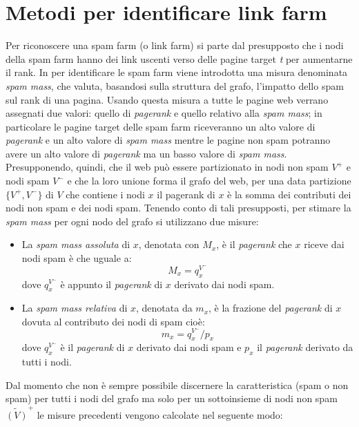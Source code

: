 \section{Metodi per identificare link farm}
Per riconoscere una spam farm (o link farm) si parte dal presupposto che i nodi della spam farm hanno dei link uscenti verso delle pagine target \textit{t} per aumentarne il rank. In \cite{Gyongyi:2006:LSD:1182635.1164166} per identificare le spam farm viene introdotta una misura denominata \textit{spam mass}, che valuta, basandosi sulla struttura del grafo, l'impatto dello spam sul rank di una pagina. Usando questa misura a tutte le pagine web verrano assegnati due valori: quello di \textit{pagerank} e quello relativo alla \textit{spam mass}; in particolare le pagine target delle spam farm riceveranno  un alto valore di \textit{pagerank} e un alto valore di \textit{spam mass} mentre le pagine non spam potranno  avere un alto valore di \textit{pagerank} ma un basso valore di \textit{spam mass}. Presupponendo, quindi, che il web può essere partizionato in nodi non spam \(V^+\) e nodi spam \(V^-\) e che la loro unione forma il grafo del web, per una data partizione \(\{V^+,V^-\}\) di \(V\) che contiene i nodi \(x\) il pagerank di \(x\) è la somma dei contributi dei nodi non spam e dei nodi spam. Tenendo conto di tali presupposti, per stimare la \textit{spam mass} per ogni nodo del grafo si utilizzano due misure:
\begin{itemize}
 \item La \textit{spam mass assoluta} di \(x\), denotata con \(M_x\), è il \textit{pagerank} che \(x\) riceve dai nodi spam è che uguale a:
 \begin{equation}
   M_x=q_x^{V^-}
 \end{equation}
dove \(q_x^{V^-}\) è appunto il \textit{pagerank} di \(x\) derivato dai nodi spam.
 \item La \textit{spam mass relativa} di \(x\), denotata da \(m_x\), è la frazione del \textit{pagerank} di \(x\) dovuta al contributo dei nodi di spam cioè: 
 \begin{equation}
   m_x=q_x^{V^-}/p_x
 \end{equation}
dove \(q_x^{V^-}\) è il \textit{pagerank} di \(x\) derivato dai nodi spam e \(p_x\) il \textit{pagerank} derivato da tutti i nodi.
\end{itemize}
Dal momento che non è sempre possibile discernere la caratteristica (spam o non spam) per tutti i nodi del grafo ma solo per un sottoinsieme di nodi non spam \(\tilde{(V)}^+\) le misure precedenti vengono calcolate nel seguente modo:
